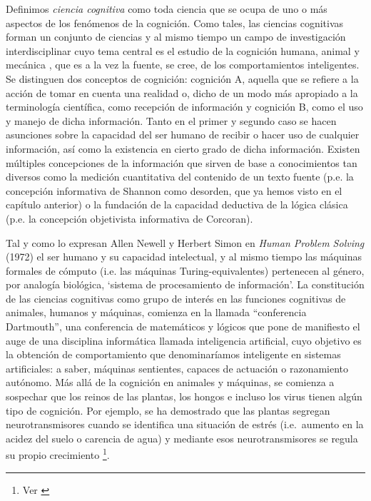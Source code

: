 \documentclass[12pt]{memoir}
\begin{document}
\begin{appendices}
Definimos \textit{ciencia cognitiva} como toda ciencia que se ocupa de uno o más aspectos de los fenómenos de la cognición. Como tales, las ciencias cognitivas forman un conjunto de ciencias y al mismo tiempo un campo de investigación interdisciplinar cuyo tema central es el estudio de la cognición humana, animal y mecánica \parencite[p.20]{pmf07}, que es a la vez la fuente, se cree, de los comportamientos inteligentes. Se distinguen dos conceptos de cognición: cognición A, aquella que se refiere a la acción de tomar en cuenta una realidad o, dicho de un modo más apropiado a la terminología científica, como recepción de información y cognición B, como el uso y manejo de dicha información. Tanto en el primer y segundo caso se hacen asunciones sobre la capacidad del ser humano de recibir o hacer uso de cualquier información, así como la existencia en cierto grado de dicha información. Existen múltiples concepciones de la información que sirven de base a conocimientos tan diversos como la medición cuantitativa del contenido de un texto fuente (p.e. la concepción informativa de Shannon como desorden, que ya hemos visto en el capítulo anterior) o la fundación de la capacidad deductiva de la lógica clásica (p.e. la concepción objetivista informativa de Corcoran).

Tal y como lo expresan Allen Newell y Herbert Simon en \textit{Human Problem Solving}
(1972) el ser humano y su capacidad intelectual, y al mismo tiempo las máquinas formales de cómputo (i.e. las máquinas Turing-equivalentes) pertenecen al género, por analogía biológica, `sistema de procesamiento de información'. La constitución de las ciencias cognitivas como grupo de interés en las funciones cognitivas de animales, humanos y máquinas, comienza en la llamada ``conferencia Dartmouth'', una conferencia de matemáticos y lógicos que pone de manifiesto el auge de una disciplina informática llamada inteligencia artificial, cuyo objetivo es la obtención de comportamiento que denominaríamos inteligente en sistemas artificiales: a saber, máquinas sentientes, capaces de actuación o razonamiento autónomo. Más allá de la cognición en animales y máquinas, se comienza a sospechar que los reinos de las plantas, los hongos e incluso los virus tienen algún tipo de cognición. Por ejemplo, se ha demostrado que las plantas segregan neurotransmisores cuando se identifica una situación de estrés (i.e.\ aumento en la acidez del suelo o carencia de agua) y mediante esos neurotransmisores se regula su propio crecimiento \footnote{Ver \cite{plants}}.


\end{appendices}
\end{document}
